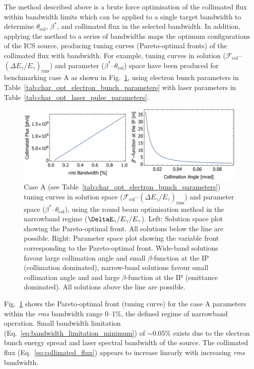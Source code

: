 \documentclass[../main.tex]{subfiles}
\begin{document}
The method described above is a brute force optimisation of the collimated flux within bandwidth limits which can be applied to a single target bandwidth to determine $\theta_{\mathrm{col}}$, $\beta^{*}$, and collimated flux in the selected bandwidth. In addition, applying the method to a series of bandwidths maps the optimum configurations of the ICS source, producing tuning curves (Pareto-optimal fronts) of the collimated flux with bandwidth. For example, tuning curves in solution ($\mathcal{F}_{\mathrm{col}}$--$\left(\Delta E_{\gamma}/E_{\gamma}\right)_{\mathrm{rms}}$) and parameter ($\beta^{*}$--$\theta_{\mathrm{col}}$) space have been produced for benchmarking case A as shown in Fig.~\ref{fig:CaseA_RB_tuning_curve}, using electron bunch parameters in Table~\ref{tab:char_opt_electron_bunch_parameters} with laser parameters in Table~\ref{tab:char_opt_laser_pulse_parameters}. 
\begin{figure}[!h]
\centering
\includegraphics[width=\textwidth]{Figures/Optimisation_and_Characterisation_of_Inverse_Compton_Scattering_Sources/Case_A_RB_Tuning_Curves.pdf}
\caption{Case A (see Table~\ref{tab:char_opt_electron_bunch_parameters}) tuning curves in solution space ($\mathcal{F}_{\mathrm{col}}$--$\left(\Delta E_{\gamma}/E_{\gamma}\right)_{\mathrm{rms}}$) and parameter space ($\beta^{*}$--$\theta_{\mathrm{col}}$), using the round beam optimisation method in the narrowband regime ($\DeltaE_{\gamma}/E_{\gamma}/E_{\gamma}$). Left: Solution space plot showing the Pareto-optimal front. All solutions below the line are possible. Right: Parameter space plot showing the variable front corresponding to the Pareto-optimal front. Wide-band solutions favour large collimation angle and small $\beta$-function at the IP (collimation dominated), narrow-band solutions favour small collimation angle and and large $\beta$-function at the IP (emittance dominated). All solutions above the line are possible.}
\label{fig:CaseA_RB_tuning_curve}
\end{figure}

Fig.~\ref{fig:CaseA_RB_tuning_curve} shows the Pareto-optimal front (tuning curve) for the case A parameters within the \textit{rms} bandwidth range 0--1\%, the defined regime of narrowband operation. Small bandwidth limitation (Eq.~\ref{eq:bandwidth_limitation_minimum}) of $\sim$0.05\% exists due to the electron bunch energy spread and laser spectral bandwidth of the source. The collimated flux (Eq.~\ref{eq:collimated_flux}) appears to increase linearly with increasing \textit{rms} bandwidth.  
\end{document}
